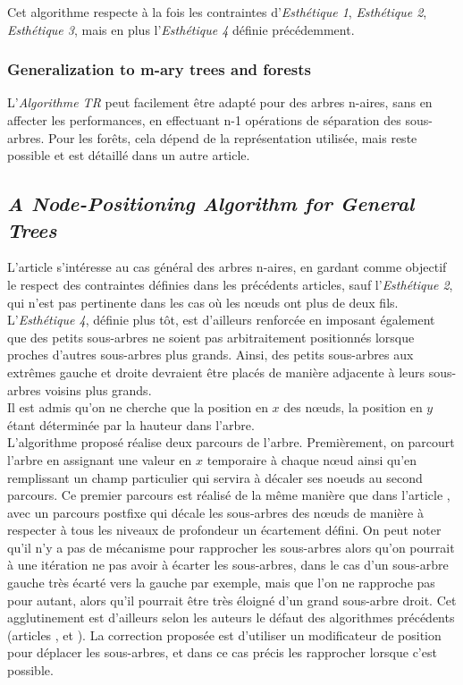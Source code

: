 \documentclass{article}
\begin{document}
  Cet algorithme respecte à la fois les contraintes d'\emph{Esthétique 1}, \emph{Esthétique 2}, \emph{Esthétique 3}, mais en plus l'\emph{Esthétique 4} définie précédemment.\\
  
  
  \subsubsection{Generalization to m-ary trees and forests}
  L'\emph{Algorithme TR} peut facilement être adapté pour des arbres n-aires, sans en affecter les performances, en effectuant n-1 opérations de séparation des sous-arbres.
  Pour les forêts, cela dépend de la représentation utilisée, mais reste possible et est détaillé dans un autre article.\\
  
  \newpage
  \subsection{\emph{A Node-Positioning Algorithm for General Trees}}
  
  L'article \cite{article90} s'intéresse au cas général des arbres n-aires, en gardant comme objectif le respect des contraintes définies dans les précédents articles, sauf l'\emph{Esthétique 2}, qui n'est pas pertinente dans les cas où les n\oe{}uds ont plus de deux fils.
  L'\emph{Esthétique 4}, définie plus tôt, est d'ailleurs renforcée en imposant également que des petits sous-arbres ne soient pas arbitraitement positionnés lorsque proches d'autres sous-arbres plus grands.
  Ainsi, des petits sous-arbres aux extrêmes gauche et droite devraient être placés de manière adjacente à leurs sous-arbres voisins plus grands.\\
  
  Il est admis qu'on ne cherche que la position en $x$ des n\oe{}uds, la position en $y$ étant déterminée par la hauteur dans l'arbre.\\
  
  L'algorithme proposé réalise deux parcours de l'arbre. Premièrement, on parcourt l'arbre en assignant une valeur en $x$ temporaire à chaque n\oe{}ud ainsi qu'en remplissant un champ particulier qui servira à décaler ses noeuds au second parcours. Ce premier parcours est réalisé de la même manière que dans l'article \cite{article81}, avec un parcours postfixe qui décale les sous-arbres des n\oe{}uds de manière à respecter à tous les niveaux de profondeur un écartement défini. On peut noter qu'il n'y a pas de mécanisme pour rapprocher les sous-arbres alors qu'on pourrait à une itération ne pas avoir à écarter les sous-arbres, dans le cas d'un sous-arbre gauche très écarté vers la gauche par exemple, mais que l'on ne rapproche pas pour autant, alors qu'il pourrait être très éloigné d'un grand sous-arbre droit. Cet agglutinement est d'ailleurs selon les auteurs le défaut des algorithmes précédents (articles \cite{article79}, et \cite{article81}).
  La correction proposée est d'utiliser un modificateur de position pour déplacer les sous-arbres, et dans ce cas précis les rapprocher lorsque c'est possible.\\
  
\end{document}
